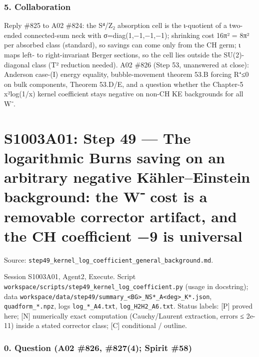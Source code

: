 \documentclass[
  10pt,
]{report}
\begin{document}
\hypertarget{collaboration}{%
\subsection{5. Collaboration}\label{collaboration}}

Reply \#825 to A02 \#824: the S⁴/Z₂ absorption cell is the ι-quotient of
a two-ended connected-sum neck with σ=diag(1,−1,−1,−1); shrinking cost
16π² = 8π² per absorbed class (standard), so savings can come only from
the CH germ; ι maps left- to right-invariant Berger sections, so the
cell lies outside the SU(2)-diagonal class (T² reduction needed). A02
\#826 (Step 53, unanswered at close): Anderson case-(I) energy equality,
bubble-movement theorem 53.B forcing R⁺≤0 on bulk components, Theorem
53.D/E, and a question whether the Chapter-5 x²log(1/x) kernel
coefficient stays negative on non-CH KE backgrounds for all W⁻.

\hypertarget{s1003a01-step-49-the-logarithmic-burns-saving-on-an-arbitrary-negative-kuxe4hlereinstein-background-the-w-cost-is-a-removable-corrector-artifact-and-the-ch-coefficient-9-is-universal}{%
\chapter{S1003A01: Step 49 --- The logarithmic Burns saving on an
arbitrary negative Kähler--Einstein background: the W⁻ cost is a
removable corrector artifact, and the CH coefficient −9 is
universal}\label{s1003a01-step-49-the-logarithmic-burns-saving-on-an-arbitrary-negative-kuxe4hlereinstein-background-the-w-cost-is-a-removable-corrector-artifact-and-the-ch-coefficient-9-is-universal}}

Source:
\texttt{step49\_kernel\_log\_coefficient\_general\_background.md}.

Session S1003A01, Agent2, Execute. Script
\texttt{workspace/scripts/step49\_kernel\_log\_coefficient.py} (usage in
docstring); data
\texttt{workspace/data/step49/summary\_\textless{}BG\textgreater{}\_NS*\_A\textless{}deg\textgreater{}\_K*.json},
\texttt{quadform\_*.npz}, logs \texttt{log\_*\_A4.txt},
\texttt{log\_H2H2\_A6.txt}. Status labels: {[}P{]} proved here; {[}N{]}
numerically exact computation (Cauchy/Laurent extraction, errors ≤
2e-11) inside a stated corrector class; {[}C{]} conditional / outline.

\hypertarget{question-a02-826-8274-spirit-58}{%
\subsection{0. Question (A02 \#826, \#827(4); Spirit
\#58)}\label{question-a02-826-8274-spirit-58}}
\end{document}
